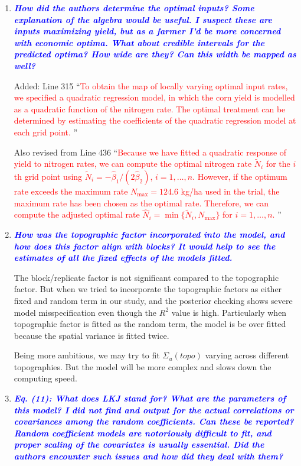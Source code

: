 \documentclass[a4paper]{article}   	%
\newcommand{\qtitle}[1]{\textit{\textbf{#1}}}
\begin{document}
\begin{enumerate}
    \item \qtitle{\textcolor{blue}{How did the authors determine the optimal inputs? Some explanation of the algebra would be useful. I suspect these are inputs maximizing yield, but as a farmer I'd be more concerned with economic optima. What about credible intervals for the predicted optima? How wide are they? Can this width be mapped as well?}}

    Added: Line 315 ``\textcolor{red}{To obtain the map of locally varying optimal input rates, we specified a quadratic regression model, in which the corn yield is modelled as a quadratic function of the nitrogen rate. The optimal treatment can be determined by estimating the coefficients of the quadratic regression model at each grid point.} ''
    
    Also revised from Line 436 ``\textcolor{red}{Because we have fitted a quadratic response of yield to nitrogen rates, we can compute the optimal nitrogen rate $\tilde{N}_{i}$ for the $i$th grid point using $\tilde{N}_{i} = -\hat{\beta}_{1}/(2\hat{\beta}_{2})$, $i=1,\ldots,n$. However, if the optimum rate exceeds the maximum rate $N_{\mbox{max}} = 124.6$ kg/ha used in the trial, the maximum rate has been chosen as the optimal rate. Therefore, we can compute the adjusted optimal rate $\hat{N}_i = \min\{ \tilde{N}_i, N_{\mbox{max}}\}$ for $i=1,\ldots,n$. }''

    \item \qtitle{\textcolor{blue}{How was the topographic factor incorporated into the model, and how does this factor align with blocks? It would help to see the estimates of all the fixed effects of the models fitted.}}

    The block/replicate factor is not significant compared to the topographic factor. But when we tried to incorporate the topographic factors as either fixed and random term in our study, and the posterior checking shows severe model misspecification even though the $R^2$ value is high. Particularly when topographic factor is fitted as the random term, the model is be over fitted because the spatial variance is fitted twice. 
    
    Being more ambitious, we may try to fit $\Sigma_u(topo)$ varying across different topographies. But the model will be more complex and slows down the computing speed. 

    \item \qtitle{\textcolor{blue}{Eq. (11): What does LKJ stand for? What are the parameters of this model? I did not find and output for the actual correlations or covariances among the random coefficients. Can these be reported? Random coefficient models are notoriously difficult to fit, and proper scaling of the covariates is usually essential. Did the authors encounter such issues and how did they deal with them?}}


\end{enumerate}
\end{document}

